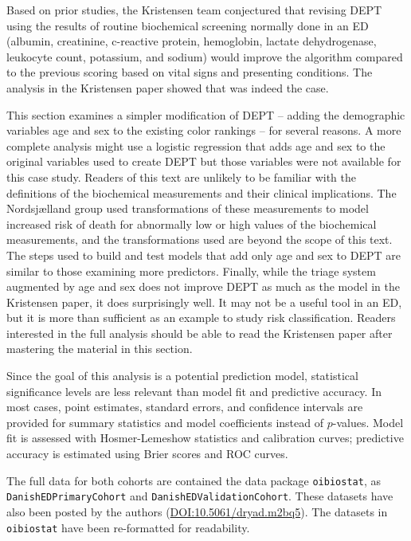 Based on prior studies, the Kristensen team conjectured that revising DEPT using  the results of routine biochemical screening normally done in an ED (albumin, creatinine, c-reactive protein, hemoglobin, lactate dehydrogenase, leukocyte count, potassium, and sodium) would improve the algorithm compared to the previous scoring based on vital signs and presenting conditions.  The analysis in the Kristensen paper showed that was indeed the case.

This section examines a simpler modification of DEPT -- adding the demographic variables age and sex to the existing color rankings -- for several reasons. A more complete analysis might use a logistic regression that adds age and sex to the original variables used to create DEPT but those variables were not available for this case study.   Readers of this text are unlikely to be familiar with the definitions of the biochemical measurements and their clinical implications. The Nordsj{\ae}lland group used transformations of these measurements to model increased risk of death for abnormally low or high values of the biochemical measurements, and the transformations used are beyond the scope of this text. The steps used to build and test models that add only age and sex to DEPT are similar to those examining more predictors. Finally, while the triage system augmented by age and sex does not improve DEPT as much as the model in the Kristensen paper, it does surprisingly well.  It may not be a useful tool in an ED, but it is more than sufficient as an example to study risk classification.    Readers interested in the full analysis should be able to read the Kristensen paper after mastering the material in this section.

Since the goal of this analysis is a potential prediction model, statistical significance levels are less relevant than model fit and predictive accuracy.  In most cases, point estimates, standard errors, and confidence intervals are provided for summary statistics and model coefficients instead of $p$-values.  Model fit is assessed with Hosmer-Lemeshow statistics and calibration curves; predictive accuracy is estimated using Brier scores and ROC curves.

The full data for both cohorts are contained the data package \texttt{oibiostat}, as \texttt{DanishEDPrimaryCohort} and \texttt{DanishEDValidationCohort}.  These datasets have also been posted by the authors (\url{DOI:10.5061/dryad.m2bq5}).  The datasets in \texttt{oibiostat} have been re-formatted for readability.


